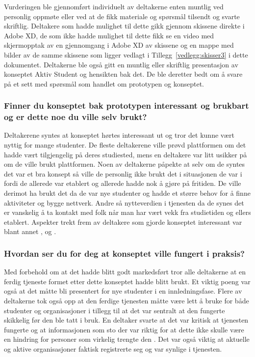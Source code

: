 Vurderingen ble gjennomført individuelt av deltakerne enten muntlig ved personlig oppmøte eller ved at de fikk materiale og spørsmål tilsendt og svarte skriftlig. Deltakere som hadde mulighet til dette gikk gjennom skissene direkte i Adobe XD, de som ikke hadde mulighet til dette fikk se en video med skjermopptak av en gjennomgang i Adobe XD av skissene og en mappe med bilder av de samme skissene som ligger vedlagt i Tillegg~\ref{vedlegg:skisser3} i dette dokumentet. Deltakerne ble også gitt en muntlig eller skriftlig presentasjon av konseptet Aktiv Student og hensikten bak det. De ble deretter bedt om å svare på et sett med spørsmål som handlet om prototypen og konseptet.

\subsubsection{Finner du konseptet bak prototypen interessant og brukbart og er dette noe du ville selv brukt?}
Deltakerene syntes at konseptet hørtes interessant ut og tror det kunne vært nyttig for mange studenter. De fleste deltakerene ville prøvd plattformen om det hadde vært tilgjengelig på deres studiested, mens en deltakere var litt usikker på om de ville brukt plattformen. Noen av deltakerne påpekte at selv om de syntes det var et bra konsept så ville de personlig ikke brukt det i situasjonen de var i fordi de allerede var etablert og allerede hadde nok å gjøre på fritiden. De ville derimot ha brukt det da de var nye studenter og hadde et større behov for å finne aktiviteter og bygge nettverk. Andre så nytteverdien i tjenesten da de synes det er vanskelig å ta kontakt med folk når man har vært vekk fra studietiden og ellers etablert. Aspekter trekt frem av deltakere som gjorde konseptet interessant var blant annet ,  og .

\subsubsection{Hvordan ser du for deg at konseptet ville fungert i praksis?}

\setlength{\leftskip}{2em}
Med forbehold om at det hadde blitt godt markedsført tror alle deltakerne at en ferdig tjeneste formet etter dette konseptet hadde blitt brukt. Et viktig poeng var også at det måtte bli presentert for nye studenter i en innledningsfase. Flere av deltakerne tok også opp at den ferdige tjenesten måtte være lett å bruke for både studenter og organisasjoner i tillegg til at det var sentralt at den fungerte skikkelig før den ble tatt i bruk. En deltaker svarte at det var kritisk at tjenesten fungerte og at informasjonen som sto der var riktig for at dette ikke skulle være en hindring for personer som virkelig trengte den . Det var også viktig at aktuelle og aktive organisasjoner faktisk registrerte seg og var synlige i tjenesten. 

